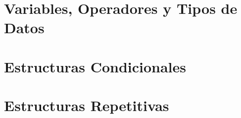 \section{Variables, Operadores y Tipos de Datos}
\section{Estructuras Condicionales}
\section{Estructuras Repetitivas}